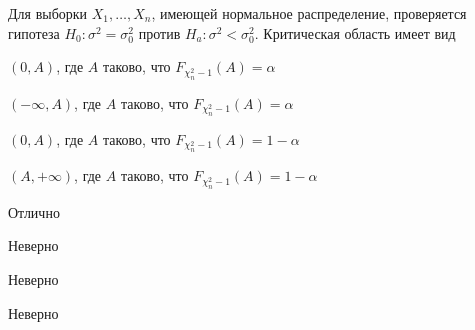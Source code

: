 
\begin{question}
Для выборки \(X_1,\ldots,X_n\), имеющей нормальное распределение,
проверяется гипотеза \(H_0: \sigma^2=\sigma_0^2\) против
\(H_a: \sigma^2 < \sigma_0^2\). Критическая область имеет вид
\begin{answerlist}
  \item \((0,A)\), где \(A\) таково, что \(F_{\chi^2_n-1} (A) =\alpha\)
  \item \((-\infty,A)\), где \(A\) таково, что \(F_{\chi^2_n-1} (A) =\alpha\)
  \item \((0,A)\), где \(A\) таково, что \(F_{\chi^2_n-1} (A) =1-\alpha\)
  \item \((A,+\infty)\), где \(A\) таково, что \(F_{\chi^2_n-1} (A) =1-\alpha\)
\end{answerlist}
\end{question}

\begin{solution}
\begin{answerlist}
  \item Отлично
  \item Неверно
  \item Неверно
  \item Неверно
\end{answerlist}
\end{solution}


